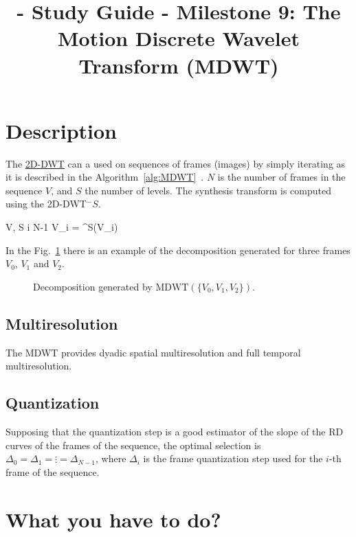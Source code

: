 
\title{\SM{} - Study Guide - Milestone 9: The Motion Discrete Wavelet Transform (MDWT)}

\maketitle

\section{Description}

The
\href{https://sistemas-multimedia.github.io/study_guide/06-2D-DWT/}{2D-DWT}
can a used on sequences of frames (images) by simply iterating as it
is described in the
Algorithm~\ref{alg:MDWT}~\cite{taubman2002jpeg2000}. $N$ is the number
of frames in the sequence $V$, and $S$ the number of levels. The
synthesis transform is computed using the 2D-DWT$^-S$.

\begin{pseudocode}{}{V, S}
  \label{alg:MDWT}
  \FOR i  \TO N-1 \DO
  V_i = ^S(V_i)
\end{pseudocode}

In the Fig.~\ref{fig:MDWT} there is an example of the decomposition
generated for three frames $V_0$, $V_1$ and $V_2$.

\begin{figure}
  \centering
  \caption{Decomposition generated by $\text{MDWT}(\{V_0, V_1, V_2\})$.}
  \label{fig:MDWT}
\end{figure}

\subsection{Multiresolution}
The MDWT provides dyadic spatial multiresolution and full temporal multiresolution.

\subsection{Quantization}
Supposing that the quantization step is a good estimator of the slope
of the RD curves of the frames of the sequence, the optimal selection
is $\Delta_0=\Delta_1=\vdots=\Delta_{N-1}$, where $\Delta_i$ is the
frame quantization step used for the $i$-th frame of the sequence.

\section{What you have to do?}

